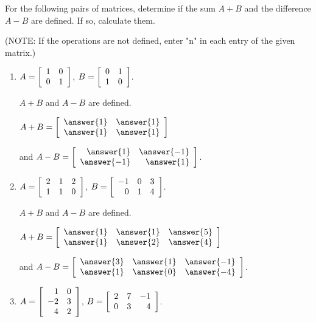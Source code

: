 \documentclass{ximera}
\author{Zack Reed}
\begin{document}
\begin{exercise}

  For the following pairs of matrices, determine if the sum $A+B$
  and the difference $A-B$ are defined. If so, calculate them.

  (NOTE: If the operations are not defined, enter "n" in each entry of the given matrix.)

  \begin{enumerate}
  \item
    $A = \startmat{rr}
      1 & 0 \\
      0 & 1
    \stopmat$,\quad
    $B = \startmat{rr}
      0 & 1 \\
      1 & 0
    \stopmat$.

    $A+B$ and $A-B$ are  defined.
    
    $A + B = \startmat{rr}
      \answer{1} & \answer{1} \\
      \answer{1} & \answer{1}
    \stopmat$
  
    and $A - B = \startmat{rr}
      \answer{1} & \answer{-1} \\
      \answer{-1} & \answer{1}
    \stopmat$.

  \item %
    $A = \startmat{rrr}
      2 & 1 & 2 \\
      1 & 1 & 0
    \stopmat$,\quad
    $B = \startmat{rrr}
      -1 & 0 & 3 \\
      0 & 1 & 4
    \stopmat$.

    $A+B$ and $A-B$ are  defined.

    $A + B = \startmat{rrr}
      \answer{1} & \answer{1} & \answer{5} \\
      \answer{1} & \answer{2} & \answer{4}
    \stopmat$

    and $A - B = \startmat{rrr}
      \answer{3} & \answer{1} & \answer{-1} \\
      \answer{1} & \answer{0} & \answer{-4}
    \stopmat$.

  \item %
    $A = \startmat{rr}
      1 & 0 \\
      -2 & 3 \\
      4 & 2
    \stopmat$,\quad
    $B = \startmat{rrr}
      2 & 7 & -1 \\
      0 & 3 & 4
    \stopmat$.


\end{enumerate}
\end{exercise}
\end{document}
